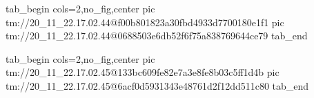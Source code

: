  
 
 
 
 

\qqSecOrig


\ifcmt
  tab_begin cols=2,no_fig,center
    pic tm://20_11_22.17.02.44@f00b801823a30fbd4933d7700180e1f1
    pic tm://20_11_22.17.02.44@0688503e6db52f6f75a838769644ce79
  tab_end
\fi


\ifcmt
  tab_begin cols=2,no_fig,center
    pic tm://20_11_22.17.02.45@133bc609fe82e7a3e8fe8b03c5ff1d4b
    pic tm://20_11_22.17.02.45@6acf0d5931343e48761d2f12dd511c80
  tab_end
\fi

